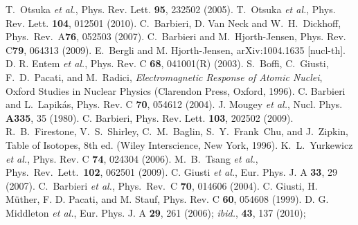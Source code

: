 \documentclass{ws-mpla}
\begin{document}
\begin{thebibliography}{99}
  T.~Otsuka {\em et al.}, Phys. Rev. Lett. {\bf 95}, 232502 (2005).
  T.~Otsuka {\em et al.}, Phys. Rev. Lett. {\bf 104}, 012501 (2010).
  C.~Barbieri, D. Van Neck and W.~H.~Dickhoff, Phys.\ Rev.\ A{\bf 76}, 052503 (2007).
 C.~Barbieri and M.~Hjorth-Jensen, Phys. Rev. C{\bf 79}, 064313 (2009).
  E.~Bergli and M. Hjorth-Jensen, arXiv:1004.1635 [nucl-th].
  D. R. Entem {\it et al.}, Phys. Rev. C {\bf 68}, 041001(R) (2003).
  S.~Boffi, C.~Giusti, F.~D.~Pacati, and M.~Radici, {\em Electromagnetic Response of Atomic Nuclei},  Oxford Studies in Nuclear Physics  (Clarendon Press, Oxford, 1996).
 C. Barbieri and L.~Lapik\'{a}s, Phys. Rev. C {\bf 70}, 054612 (2004).
 J. Mougey {\it et al.}, Nucl. Phys. {\bf A335}, 35 (1980).
 C. Barbieri, Phys. Rev. Lett. {\bf 103}, 202502 (2009).
 R.~B.~Firestone, V.~S.~Shirley, C.~M.~Baglin, S.~Y.~Frank~Chu, and J.~Zipkin, Table of Isotopes, 8th ed. (Wiley Interscience, New York, 1996).
  K.~L.~Yurkewicz {\em et al.}, Phys. Rev. C {\bf 74}, 024304 (2006).
  M.~B.~Tsang {\it et al.}, Phys.\ Rev.\ Lett.\  {\bf 102}, 062501 (2009).
  C. Giusti {\it et al.}, Eur. Phys. J. A {\bf 33}, 29 (2007).
 C.~Barbieri {\it et al.}, Phys.\ Rev.\ C {\bf 70}, 014606 (2004).
  C. Giusti, H. M\"uther, F. D. Pacati, and M. Stauf, Phys. Rev. C {\bf 60}, 054608 (1999).
  D. G. Middleton {\it et al.}, Eur. Phys. J. A {\bf 29}, 261 (2006); {\em ibid.}, {\bf 43}, 137 (2010);

\end{thebibliography}
\end{document}

